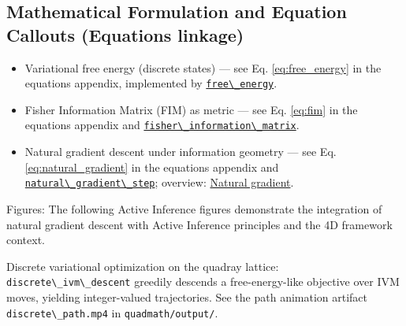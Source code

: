 \documentclass[
  10pt,
]{article}
\newcommand{\passthrough}[1]{#1}
\begin{document}
\hypertarget{mathematical-formulation-and-equation-callouts-equations-linkage}{%
\subsection{Mathematical Formulation and Equation Callouts (Equations
linkage)}\label{mathematical-formulation-and-equation-callouts-equations-linkage}}

\begin{itemize}
\item
  Variational free energy (discrete states) --- see Eq.
  \eqref{eq:free_energy} in the equations appendix, implemented by
  \href{08_equations_appendix.md\#code:free_energy}{\passthrough{\lstinline!free\_energy!}}.
\item
  Fisher Information Matrix (FIM) as metric --- see Eq. \eqref{eq:fim}
  in the equations appendix and
  \href{08_equations_appendix.md\#code:fisher_information_matrix}{\passthrough{\lstinline!fisher\_information\_matrix!}}.
\item
  Natural gradient descent under information geometry --- see Eq.
  \eqref{eq:natural_gradient} in the equations appendix and
  \href{08_equations_appendix.md\#code:natural_gradient_step}{\passthrough{\lstinline!natural\_gradient\_step!}};
  overview:
  \href{https://en.wikipedia.org/wiki/Natural_gradient}{Natural
  gradient}.
\end{itemize}

Figures: The following Active Inference figures demonstrate the
integration of natural gradient descent with Active Inference principles
and the 4D framework context.

Discrete variational optimization on the quadray lattice:
\passthrough{\lstinline!discrete\_ivm\_descent!} greedily descends a
free-energy-like objective over IVM moves, yielding integer-valued
trajectories. See the path animation artifact
\passthrough{\lstinline!discrete\_path.mp4!} in
\passthrough{\lstinline!quadmath/output/!}.
\end{document}
